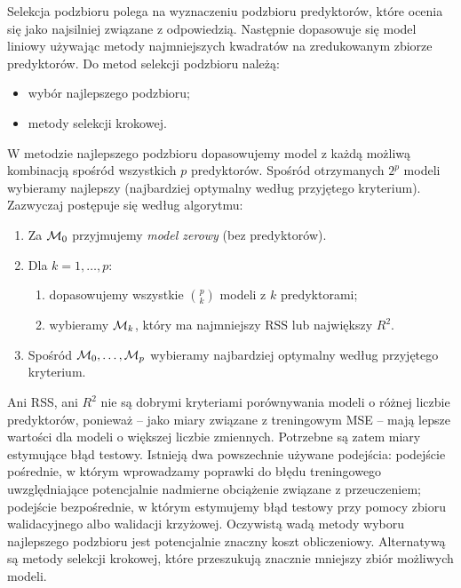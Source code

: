 \documentclass{myclass}
\begin{document}
Selekcja podzbioru polega na wyznaczeniu podzbioru predyktorów, które ocenia się jako najsilniej
związane z odpowiedzią. Następnie dopasowuje się model liniowy używając metody najmniejszych
kwadratów na zredukowanym zbiorze predyktorów. Do metod selekcji podzbioru należą: 
\begin{itemize}
\item wybór najlepszego podzbioru;
\item metody selekcji krokowej.
\end{itemize}

W metodzie najlepszego podzbioru dopasowujemy model z każdą możliwą kombinacją spośród wszystkich
\(p\) predyktorów. Spośród otrzymanych \(2^p\) modeli wybieramy najlepszy (najbardziej optymalny
według przyjętego kryterium). Zazwyczaj postępuje się według algorytmu:
\begin{enumerate}
\item Za \(\mathcal{M}_0\) przyjmujemy \emph{model zerowy} (bez predyktorów).
\item Dla \(k=1,\ldots,p\):
    \begin{enumerate}
    \item dopasowujemy wszystkie \({p \choose k}\) modeli z \(k\) predyktorami;
    \item wybieramy \(\mathcal{M}_k\), który ma najmniejszy RSS lub największy \(R^2\).
    \end{enumerate}
\item Spośród \(\mathcal{M}_0, \ldots, \mathcal{M}_p\) wybieramy najbardziej optymalny według przyjętego
kryterium.
\end{enumerate}
Ani RSS, ani \(R^2\) nie są dobrymi kryteriami porównywania modeli o różnej liczbie predyktorów,
ponieważ -- jako miary związane z treningowym MSE -- mają lepsze wartości dla modeli o większej
liczbie zmiennych. Potrzebne są zatem miary estymujące błąd testowy. Istnieją dwa powszechnie
używane podejścia: podejście pośrednie, w którym wprowadzamy poprawki do błędu treningowego
uwzględniające potencjalnie nadmierne obciążenie związane z przeuczeniem; podejście bezpośrednie, w
którym estymujemy błąd testowy przy pomocy zbioru walidacyjnego albo walidacji krzyżowej. Oczywistą
wadą metody wyboru najlepszego podzbioru jest potencjalnie znaczny koszt obliczeniowy. Alternatywą
są metody selekcji krokowej, które przeszukują znacznie mniejszy zbiór możliwych modeli.
\end{document}
